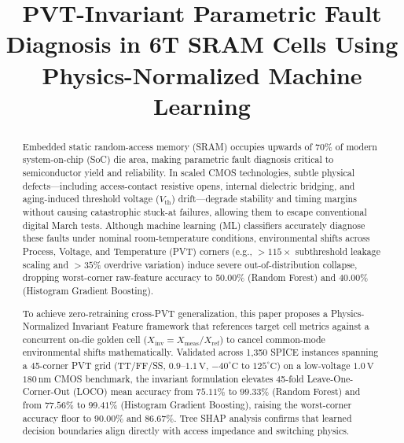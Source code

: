 \documentclass[conference]{IEEEtran}
\begin{document}
\title{PVT-Invariant Parametric Fault Diagnosis in 6T SRAM Cells Using Physics-Normalized Machine Learning\\
}

\author{
}

\maketitle

\begin{abstract}
Embedded static random-access memory (SRAM) occupies upwards of 70\% of modern system-on-chip (SoC) die area, making parametric fault diagnosis critical to semiconductor yield and reliability. In scaled CMOS technologies, subtle physical defects---including access-contact resistive opens, internal dielectric bridging, and aging-induced threshold voltage ($V_{\text{th}}$) drift---degrade stability and timing margins without causing catastrophic stuck-at failures, allowing them to escape conventional digital March tests. Although machine learning (ML) classifiers accurately diagnose these faults under nominal room-temperature conditions, environmental shifts across Process, Voltage, and Temperature (PVT) corners (e.g., $>115\times$ subthreshold leakage scaling and $>35\%$ overdrive variation) induce severe out-of-distribution collapse, dropping worst-corner raw-feature accuracy to 50.00\% (Random Forest) and 40.00\% (Histogram Gradient Boosting).

To achieve zero-retraining cross-PVT generalization, this paper proposes a Physics-Normalized Invariant Feature framework that references target cell metrics against a concurrent on-die golden cell ($X_{\text{inv}} = X_{\text{meas}} / X_{\text{ref}}$) to cancel common-mode environmental shifts mathematically. Validated across 1,350 SPICE instances spanning a 45-corner PVT grid (TT/FF/SS, $0.9\text{--}1.1\,\text{V}$, $-40^\circ\text{C}$ to $125^\circ\text{C}$) on a low-voltage $1.0\,\text{V}$ $180\,\text{nm}$ CMOS benchmark, the invariant formulation elevates 45-fold Leave-One-Corner-Out (LOCO) mean accuracy from $75.11\%$ to $99.33\%$ (Random Forest) and from $77.56\%$ to $99.41\%$ (Histogram Gradient Boosting), raising the worst-corner accuracy floor to $90.00\%$ and $86.67\%$. Tree SHAP analysis confirms that learned decision boundaries align directly with access impedance and switching physics.
\end{abstract}
\end{document}

